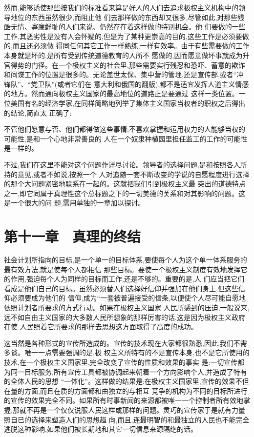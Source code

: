 ﻿\documentclass[12pt]{article}
\begin{document}
然而,能够诱使那些按我们的标准看来算是好人的人们去追求极权主义机构中的领导地位的东西虽然很少,而阻止他
们去那样做的东西却又很多,尽管如此,对那些残酷无情、寡廉鲜耻的人们来说、仍然存在着这样做的特别机会。他
们要做的一些工作,其恶劣性是没有人会怀疑的,但是为了某种更崇高的目的,这些工作是必须要做的,而且还必须做
得同任何其它工作一样熟练,一样有效率。由于有些需要做的工作本身就是坏的,是所有受到传统道德教育的人所不
愿做的,因而愿意做坏事就成为升官得势的门径。在一个极权主义的社会里,那些需要实行残忍和恐吓、蓄意的欺诈
和间谍工作的位置是很多的。无论盖世太保、集中营的管理,还是宣传部,或者``冲锋队''、``党卫队''(或者它们在
意大利和俄国的翻版),都不是适宜发挥人道主义情感的地方。然而通向极权主义国家的最高地位的道路正是要通过
这样一类位置。一位美国有名的经济学家,在同样简略地列举了集体主义国家当权者的职权之后得出的结论,简直太
正确了:

不管他们愿意与否、他们都得做这些事情;不喜欢掌握和运用权力的人能够当权的可能性,是和一个心地非常善良的
人在一个奴隶种植园里担任监工的工作的可能性是一样的。

不过,我们在这里不能对这个问题作详尽讨论。领导者的选择问题,是和按照各人所持的意见,或者不如说,按照一个
人对追随一套不断改变的学说的自愿程度进行选择的那个大问题紧密地联系在一起的。这就把我们引到极权主义最
突出的道德特点之一,即它同属于真理性这个总标题之下的一切美德的关系和对其影响的问题。这是一个很大的问
题,需用单独的一章加以探讨。



\section{第十一章　真理的终结}


社会计划所指向的目标,是一个单一的目标体系,要使每个人为这个单一体系服务的最有效方法,就是使每个人都相信
那些目标。要使一个极权主义制度有效地发挥它的作用,强迫每个人为同样的目标而工作,还是不够的。重要的是,人
们应当把它们看成是他们自己的目标。虽然必须替人们选择好信仰并强加在他们身上,但这些信仰必须要成为他们的
信仰,成为``一套被普遍接受的信条,以便使个人尽可能自愿地依照计划者所要求的方式行动。如果在极权主义国家
人民所感到的压迫,一般说来,远不如自由主义国家的大多数人民所想象的那样厉害的话,这是因为极权主义政府在使
人民照着它所要求的那样去思想这方面取得了高度的成功。

这当然是各种形式的宣传所造成的。宣传的技术现在大家都很熟悉,因此,我们不需多谈。唯一一点需要强调的是,极
权主义所特有的不是宣传本身,也不是它所使用的技术,在一个极权主义国家里,完全改变了宣传的性质和效果的事实
是:一切宣传都为同一目标服务,所有宣传工具都被协调起来朝着一个方向影响个人,并造成了特有的全体人民的思想
``一体化''。这样做的结果是:在极权主义国家里,宣传的效果不但在量的方面,而且在质的方面都和由独立的与相互
竞争的机构为不同的目标所进行的宣传的效果完全不同。如果所有时事新闻的来源都被唯一一个控制者所有效地掌
握,那就不再是一个仅仅说服人民这样或那样的问题。灵巧的宣传家于是就有力量照自已的选择来塑造人们的思想趋
向,而且,连最明智的和最独立的人民也不能完全逃脱这种影响,如果他们被长期地和其它一切信息来源隔绝的话。
\end{document}

